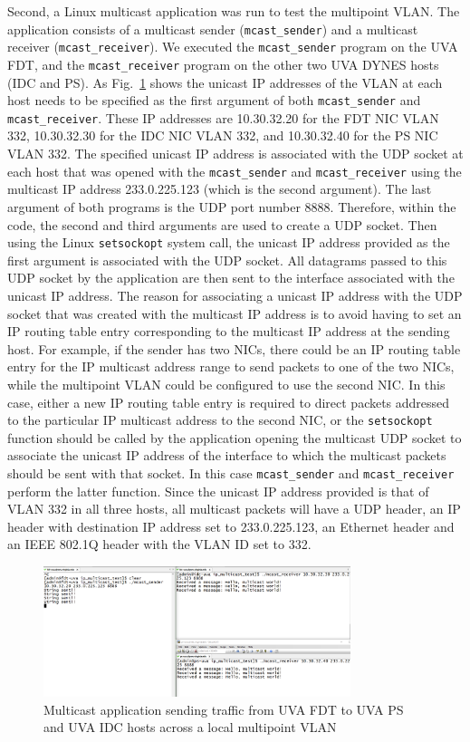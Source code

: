 Second, a Linux multicast application was run to test the multipoint VLAN. The application
consists of a multicast sender (\texttt{mcast\_sender}) and a multicast receiver (\texttt{mcast\_receiver}).
We executed the \texttt{mcast\_sender} program on the UVA FDT, and the \texttt{mcast\_receiver} program
on the other two UVA DYNES hosts (IDC and PS).
As Fig.~\ref{fig:localmulticast} shows the unicast IP addresses of the VLAN at each host needs
to be specified as the first argument of both \texttt{mcast\_sender} and \texttt{mcast\_receiver}. These
IP addresses are 10.30.32.20 for the FDT NIC VLAN 332, 10.30.32.30 for the IDC NIC VLAN 332, and 
10.30.32.40 for the PS NIC VLAN 332. The specified unicast IP address is associated with the UDP socket
at each host that was opened with the \texttt{mcast\_sender} and \texttt{mcast\_receiver} using the multicast IP address 233.0.225.123 (which is the second argument). The last argument of both programs is the UDP port number 8888. 
Therefore, within the code, the second and third arguments are used to create a UDP socket. Then using
the Linux \texttt{setsockopt} system call, the unicast IP address provided as the first argument is associated
with the UDP socket. All datagrams passed to this UDP socket by the application are then sent to the interface
associated with the unicast IP address. The reason for associating a unicast IP address with the UDP socket that was created
with the multicast IP address is to avoid having to set an IP routing table entry corresponding
to the multicast IP address at the sending host. For example, if the sender has two NICs,
there could be an IP routing table entry for
the IP multicast address range to send packets to one of the two NICs, while the multipoint VLAN
could be configured to use the second NIC. In this case, either a new IP routing table entry is required
to direct packets addressed to the particular IP multicast address to the second NIC,
or the \texttt{setsockopt} function should be called by the application opening the multicast UDP socket
to associate the unicast IP address of the interface to which the multicast packets should be sent with that socket. In this case \texttt{mcast\_sender} and  \texttt{mcast\_receiver} perform the latter function. Since the unicast IP address provided is that of VLAN 332 in all
three hosts, all multicast packets will have a UDP header, an IP header with destination IP address set
to 233.0.225.123, an Ethernet header and an IEEE 802.1Q header with the VLAN ID set to 332. 
\begin{figure}[htb!]
\centering
\includegraphics[width=0.8\textwidth]{figures/local-multicast.png}
\caption{Multicast application sending traffic from UVA FDT to UVA PS and UVA IDC hosts across a local multipoint VLAN}
\label{fig:localmulticast}
\end{figure}

